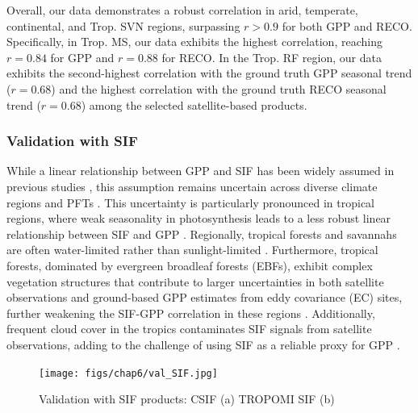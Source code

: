 Overall, our data demonstrates a robust correlation in arid, temperate, continental, and Trop. SVN regions, surpassing $r> 0.9$ for both GPP and RECO. Specifically, in Trop. MS, our data exhibits the highest correlation, reaching $r=0.84$ for GPP and $r=0.88$ for RECO. In the Trop. RF region, our data exhibits the second-highest correlation with the ground truth GPP seasonal trend ($r=0.68$) and the highest correlation with the ground truth RECO seasonal trend ($r=0.68$) among the selected satellite-based products. \par


\subsubsection{Validation with SIF}
While a linear relationship between GPP and SIF has been widely assumed in previous studies \citep{guanter2012retrieval, yang2017chlorophyll}, this assumption remains uncertain across diverse climate regions and PFTs \citep{gu2019sun, xiao2019solar, zhang2016model, chen2021seasonal}. This uncertainty is particularly pronounced in tropical regions, where weak seasonality in photosynthesis leads to a less robust linear relationship between SIF and GPP \citep{doughty2021global}. Regionally, tropical forests and savannahs are often water-limited rather than sunlight-limited \citep{guan2015photosynthetic, rs9060530, Madani_2020, palmer2023drivers}. Furthermore, tropical forests, dominated by evergreen broadleaf forests (EBFs), exhibit complex vegetation structures that contribute to larger uncertainties in both satellite observations and ground-based GPP estimates from eddy covariance (EC) sites, further weakening the SIF-GPP correlation in these regions \citep{hayek201890, xietal2018, zhang2020111722, shekhar2022113282}. Additionally, frequent cloud cover in the tropics contaminates SIF signals from satellite observations, adding to the challenge of using SIF as a reliable proxy for GPP \citep{doughty2021global, shekhar2022113282}.\par

\begin{figure}[tbh!]
    \centering
    \texttt{[image: figs/chap6/val\_SIF.jpg]}
    \caption[Validation with SIF products]{Validation with SIF products: CSIF (a) TROPOMI SIF (b)}
    \label{fig:chap6_fig5}
\end{figure}

